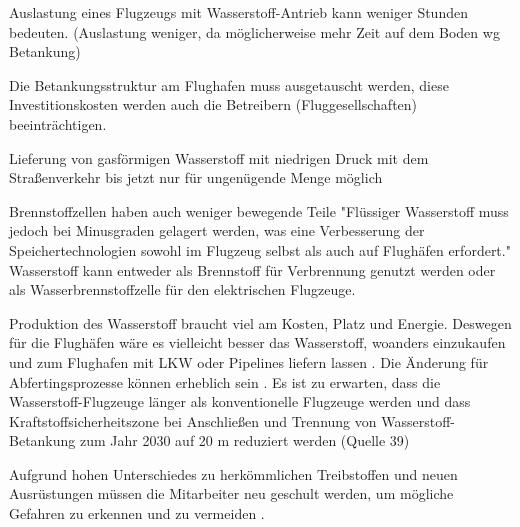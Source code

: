 Auslastung eines Flugzeugs mit Wasserstoff-Antrieb kann weniger Stunden bedeuten. (Auslastung weniger, da möglicherweise mehr Zeit auf dem Boden
wg Betankung) 

Die Betankungsstruktur am Flughafen muss ausgetauscht werden, diese Investitionskosten werden auch die Betreibern (Fluggesellschaften)
beeinträchtigen. 

Lieferung von gasförmigen Wasserstoff mit niedrigen Druck mit dem Straßenverkehr bis jetzt nur für ungenügende Menge möglich \cite{undertaking2022strategic}

Brennstoffzellen haben auch weniger bewegende Teile \cite{dalmia2022powering}
"Flüssiger Wasserstoff muss jedoch bei Minusgraden gelagert werden, was eine Verbesserung der Speichertechnologien sowohl im Flugzeug selbst als auch auf Flughäfen erfordert."
Wasserstoff kann entweder als Brennstoff für Verbrennung genutzt werden oder als Wasserbrennstoffzelle für den elektrischen Flugzeuge. \cite{dalmia2022powering}

Produktion des Wasserstoff braucht viel am Kosten, Platz und Energie. Deswegen für die Flughäfen wäre es vielleicht besser das Wasserstoff, woanders einzukaufen und zum Flughafen 
mit LKW oder Pipelines liefern lassen \cite{gu2023hydrogen}. Die Änderung für Abfertingsprozesse können erheblich sein \cite{ati_hydrogen_infrastructure}. Es ist zu erwarten, dass die Wasserstoff-Flugzeuge länger als konventionelle Flugzeuge werden
und dass Kraftstoffsicherheitszone bei Anschließen und Trennung von Wasserstoff-Betankung zum Jahr 2030 auf 20 m reduziert werden (Quelle 39)

Aufgrund hohen Unterschiedes zu herkömmlichen Treibstoffen und neuen Ausrüstungen müssen die Mitarbeiter neu geschult werden, 
um mögliche Gefahren zu erkennen und zu vermeiden \cite{gu2023hydrogen}.

